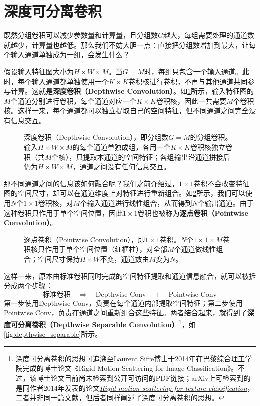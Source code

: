 \section{深度可分离卷积}

既然分组卷积可以减少参数量和计算量，且分组数$G$越大，每组需要处理的通道数就越少，计算量也越低。那么我们不妨大胆一点：直接把分组数增加到最大，让每个输入通道单独成为一组，会发生什么？

假设输入特征图大小为$H\times W\times M$。当$G=M$时，每组只包含一个输入通道。此时，每个输入通道都单独使用一个$K\times K$卷积核进行卷积，不再与其他通道共同参与计算。这就是\textbf{深度卷积（Depthwise Convolution）}。如\cref{fig:depthwise}所示，输入特征图的$M$个通道分别进行卷积，每个通道对应一个$K\times K$卷积核，因此一共需要$M$个卷积核。这样一来，每个通道都可以独立提取自己的空间特征，但不同通道之间完全没有信息交互。

\begin{figure}[H]
    \caption{深度卷积（Depthwise Convolution），即分组数$G=M$的分组卷积。输入$H\times W\times M$的每个通道单独成组，各用一个$K\times K$卷积核独立卷积（共$M$个核），只提取本通道的空间特征；各组输出沿通道拼接后仍为$H\times W\times M$，通道之间没有任何信息交互。}
    \label{fig:depthwise}
\end{figure}

那不同通道之间的信息该如何融合呢？我们之前介绍过，$1\times1$卷积不会改变特征图的空间尺寸，却可以在通道维度上对特征进行重新组合。如\cref{fig:pointwise}所示，我们可以使用$N$个$1\times1$卷积核，对$M$个输入通道进行线性组合，从而得到$N$个输出通道。由于这种卷积只作用于单个空间位置，因此$1\times1$卷积也被称为\textbf{逐点卷积（Pointwise Convolution）}。

\begin{figure}[H]
    \caption{逐点卷积（Pointwise Convolution），即$1\times 1$卷积。$N$个$1\times 1\times M$卷积核只作用于单个空间位置（红框柱），对全部$M$个通道做线性组合；空间尺寸保持$H\times W$不变，通道数由$M$变为$N$。}
    \label{fig:pointwise}
\end{figure}

这样一来，原本由标准卷积同时完成的空间特征提取和通道信息融合，就可以被拆分成两个步骤：
$$
\text{标准卷积}\quad\Longrightarrow\quad\text{Depthwise Conv}\quad+\quad\text{Pointwise Conv}
$$
第一步使用Depthwise Conv，负责在每个通道内部提取空间特征；第二步使用Pointwise Conv，负责在通道之间重新组合这些特征。两者结合起来，就得到了\textbf{深度可分离卷积（Depthwise Separable Convolution）}\footnote{深度可分离卷积的思想可追溯至Laurent Sifre博士于2014年在巴黎综合理工学院完成的博士论文《Rigid-Motion Scattering for Image Classification》。不过，该博士论文目前尚未检索到公开可访问的PDF链接；arXiv上可检索到的是同作者2014年发表的论文\href{https://arxiv.org/abs/1403.1687}{\textit{Rigid-motion scattering for texture classification}}，二者并非同一篇文献，但后者同样阐述了深度可分离卷积的思想。}，如\cref{fig:depthwise_separable}所示。

